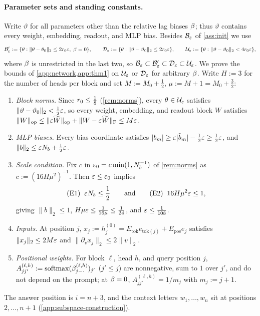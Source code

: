 \paragraph{Parameter sets and standing constants.}
Write $\vartheta$ for all parameters other than the relative lag biases $\beta$; thus $\vartheta$ contains every weight, embedding, readout, and MLP bias. Besides $\mathcal B_{\varepsilon}$ of \cref{ass:init} we use
\[
  \mathcal B_{\varepsilon}' := \{\theta : \|\theta - \theta_0\|_2 \le 2r_0\varepsilon,\; \beta = 0\}, \qquad
  \mathcal D_{\varepsilon} := \{\theta : \|\vartheta - \vartheta_0\|_2 \le 2r_0\varepsilon\}, \qquad
  \mathcal U_{\varepsilon} := \{\theta : \|\vartheta - \vartheta_0\|_2 < 4r_0\varepsilon\},
\]
where $\beta$ is unrestricted in the last two, so $\mathcal B_{\varepsilon} \subset \mathcal B_{\varepsilon}' \subset \mathcal D_{\varepsilon} \subset \mathcal U_{\varepsilon}$. We prove the bounds of \cref{app:network,app:thm1} on $\mathcal U_{\varepsilon}$ or $\mathcal D_{\varepsilon}$ for arbitrary $\beta$. Write $H := 3$ for the number of heads per block and set $M := M_0 + \frac{1}{2}$, $\mu := M + 1 = M_0 + \frac{3}{2}$:
\begin{enumerate}[label=(\Alph*),leftmargin=*,nosep,topsep=2pt]
\item[(N1)] \emph{Block norms.} Since $r_0 \le \frac{1}{8}$ (\cref{rem:norms}), every $\theta \in \mathcal U_{\varepsilon}$ satisfies $\|\vartheta - \vartheta_0\|_2 < \frac{1}{2}\varepsilon$, so every weight, embedding, and readout block $W$ satisfies $\|W\|_{\mathrm{op}} \le \|\varepsilon\widetilde W\|_{\mathrm{op}} + \|W - \varepsilon\widetilde W\|_{\mathrm{F}} \le M\varepsilon$.
\item[(N2)] \emph{MLP biases.} Every bias coordinate satisfies $|b_m| \ge \varepsilon|\tilde b_m| - \frac{1}{2}\varepsilon \ge \frac{1}{2}\varepsilon$, and $\|b\|_2 \le \varepsilon N_b + \frac{1}{2}\varepsilon$.
\item[(E)] \emph{Scale condition.} Fix $c$ in $\varepsilon_0 = c\min(1, N_b^{-1})$ of \cref{rem:norms} as $c := (16 H \mu^2)^{-1}$. Then $\varepsilon \le \varepsilon_0$ implies
\begin{equation}
  \text{(E1)}\;\; \varepsilon N_b \le \frac{1}{2}
  \qquad\text{and}\qquad
  \text{(E2)}\;\; 16 H \mu^2\varepsilon \le 1,
  \label{eq:scale-E}
\end{equation}
giving $\|b\|_2 \le 1$, $H\mu\varepsilon \le \frac{1}{16\mu} \le \frac{1}{24}$, and $\varepsilon \le \frac{1}{108}$.
\item[(In)] \emph{Inputs.} At position $j$, $x_j := h_j^{(0)} = E_{\mathrm{tok}} e_{\mathrm{tok}(j)} + E_{\mathrm{pos}} e_j$ satisfies $\|x_j\|_2 \le 2M\varepsilon$ and $\|\partial_v x_j\|_2 \le 2\|v\|_2$.
\item[(A)] \emph{Positional weights.} For block $\ell$, head $h$, and query position $j$, $A_{jj'}^{(\ell,h)} := \operatorname{softmax}(\beta_{j-\cdot}^{(\ell,h)})_{j'}$ ($j' \le j$) are nonnegative, sum to $1$ over $j'$, and do not depend on the prompt; at $\beta = 0$, $A_{jj'}^{(\ell,h)} = 1/m_j$ with $m_j := j + 1$.
\end{enumerate}
The answer position is $i = n + 3$, and the context letters $w_1,\ldots,w_n$ sit at positions $2,\ldots,n+1$ (\cref{app:subspace-construction}).

